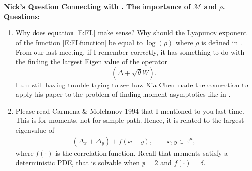 \documentclass[a4paper,11pt]{article}
\numberwithin{equation}{section}
\theoremstyle{plain}
\theoremstyle{definition}
\newcommand{\R}{\mathbb{R}}
\newcounter{NQ}
\newenvironment{NickQuestion}[1][] %
{\refstepcounter{NQ}
	\begin{mdframed}[backgroundcolor=lightgray]\textbf{Nick's Question \theNQ \: #1~~}~~~\noindent}%
	{\end{mdframed}}
\numberwithin{NQ}{section}
\numberwithin{LQ}{section}
\numberwithin{ZQ}{section}
\begin{document}
\begin{NickQuestion}[Connecting \cite{BCC21} with \cite{BCR09}. The importance of $\mathcal{M}$ and $\rho$.]
\textbf{Questions:}
\begin{enumerate}
	\item Why does equation \eqref{E:FL} make sense? Why should the Lyapunov exponent of the function \eqref{E:FLfunction} be equal to $\log(\rho)$ where $\rho$ is defined in \cite{BCR09}. From our last meeting, if I remember correctly, it has something to do with the finding the largest Eigen value of the operator
		\[
			(\Delta + \sqrt{\theta}\dot{W}).
		\]
	I am still having trouble trying to see how Xia Chen made the connection to apply his paper \cite{BCR09} to the problem of finding moment asymptotics like in \cite{BCC21}.
\item[Answer:] Please read Carmona \& Molchanov 1994 that I mentioned to you last time. This is for
	moments, not for sample path. Hence, it is related to the largest eigenvalue of
	\begin{align*}
		\left(\Delta_x + \Delta_y\right) + f(x-y), \qquad x,y\in\R^d,
	\end{align*}
	where $f(\cdot)$ is the correlation function. Recall that moments satisfy a deterministic PDE,
	that is solvable when $p=2$ and $f(\cdot)=\delta$.
\end{enumerate}
\end{NickQuestion}
\end{document}
